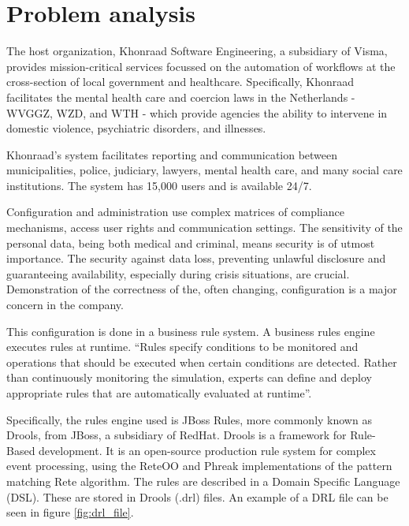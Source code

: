 \section{Problem analysis}

The host organization, Khonraad Software Engineering, a subsidiary of Visma, provides mission-critical services focussed on the automation of workflows at the cross-section of local government and healthcare.
Specifically, Khonraad facilitates the mental health care and coercion laws in the Netherlands - WVGGZ, WZD, and WTH - which provide agencies the ability to intervene in domestic violence, psychiatric disorders, and illnesses.

Khonraad's system facilitates reporting and communication between municipalities, police, judiciary, lawyers, mental health care, and many social care institutions.
The system has 15,000 users and is available 24/7. 

Configuration and administration use complex matrices of compliance mechanisms, access user rights and communication settings.
The sensitivity of the personal data, being both medical and criminal, means security is of utmost importance.
The security against data loss, preventing unlawful disclosure and guaranteeing availability, especially during crisis situations, are crucial.
Demonstration of the correctness of the, often changing, configuration is a major concern in the company. 

This configuration is done in a business rule system. 
A business rules engine executes rules at runtime. 
``Rules specify conditions to be monitored and operations that should be executed when certain conditions are detected.
Rather than continuously monitoring the simulation, experts can define and deploy appropriate rules that are automatically evaluated at runtime''\cite{liu2003dios++}. 

Specifically, the rules engine used is JBoss Rules, more commonly known as Drools, from JBoss, a subsidiary of RedHat\cite{browne2009jboss}.
Drools is a framework for Rule-Based development.
It is an open-source production rule system for complex event processing, using the ReteOO and Phreak implementations of the pattern matching Rete algorithm\cite{forgy1989rete}.
The rules are described in a Domain Specific Language (DSL).
These are stored in Drools (.drl) files. 
An example of a DRL file can be seen in figure \ref{fig:drl_file}. 

